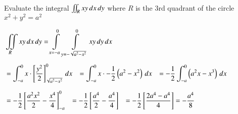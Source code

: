 \documentclass[11pt]{extarticle}
\newcommand{\dx}{{\,dx}}
\newcommand{\dy}{{\,dy}}
\newcommand{\mint}{\int\displaylimits}
\newcommand{\miint}{\iint\displaylimits}
\begin{document}
\vspace{4ex}
\textbf{} Evaluate the integral $\miint_R xy\dx\dy$ where $R$ is the 3rd quadrant of the circle $x^2+y^2=a^2$

\begin{minipage}[t]{0.68\linewidth}
\noindent
   \begin{adjustbox}{valign=t}
      $\begin{aligned}
         & \miint_R xy\dx\dy = \mint_{x=-a}^0 \mint_{y=-\sqrt{a^2-x^2}}^{0} xy \dy\dx  \\[1ex]
         & =\int^0_{-a} x \cdot \left[\frac{y^2}{2}\right]^0_{\sqrt{a^2-x^2}} \dx
         \tab =\int^0_{-a} x  \cdot -\frac{1}{2}\left(a^2-x^2\right) \dx
         \tab =-\frac{1}{2} \int^0_{-a} \left(a^2x-x^3\right) \dx \\[1.5ex]
         & =-\frac{1}{2}\left[\frac{a^2 x^2}{2}-\frac{x^4}{4}\right]^0_{-a}
         \tab =-\frac{1}{2}\left[\frac{a^4}{2}-\frac{a^4}{4}\right]
         \tab =-\frac{1}{2}\left[\frac{2 a^4-a^4}{4}\right]=-\frac{a^4}{8}
      \end{aligned}$
   \end{adjustbox}
\end{minipage}\hspace{0.5ex}
\end{document}
